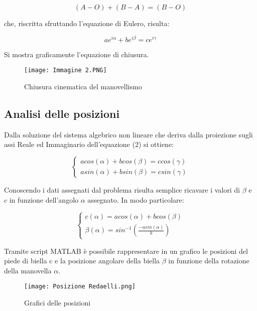 \documentclass{article}
\begin{document}
\begin{equation}
    (A - O) + (B - A) = (B - O)
\end{equation}

che, riscritta sfruttando l'equazione di Eulero, risulta: 

\begin{equation}
    ae^{i\alpha} + be^{i\beta} = ce^{i\gamma}
\end{equation}

Si mostra graficamente l'equazione di chiusura.

\begin{figure}[h!]
    \centering
    \texttt{[image: Immagine 2.PNG]}
    \caption{Chiusura cinematica del manovellismo}
    \label{fig:2}
\end{figure}

\subsection{Analisi delle posizioni}
Dalla soluzione del sistema algebrico non lineare che deriva dalla proiezione sugli assi Reale ed Immaginario dell'equazione (2) si ottiene:

\begin{equation}
    \begin{cases}
        acos(\alpha) + bcos(\beta) = ccos(\gamma) \\
        asin(\alpha) + bsin(\beta) = csin(\gamma)
    \end{cases}
\end{equation}

Conoscendo i dati assegnati dal problema risulta semplice ricavare i valori di $\beta$ e $c$ in funzione dell'angolo $\alpha$ assegnato. 
In modo particolare: 

\begin{equation}
    \begin{cases}
        c(\alpha) = acos(\alpha) + bcos(\beta) \\
        \beta(\alpha) = sin^{-1}(\frac{-asin(\alpha)}{b})
    \end{cases}
\end{equation}

Tramite script MATLAB è possibile rappresentare in un grafico le posizioni del piede di biella c e la posizione angolare della biella $\beta$ in funzione della rotazione della manovella $\alpha$.

\begin{figure}[h!]
    \centering
    \texttt{[image: Posizione Redaelli.png]}
    \caption{Grafici delle posizioni}
    \label{fig:3}
\end{figure}
\end{document}
